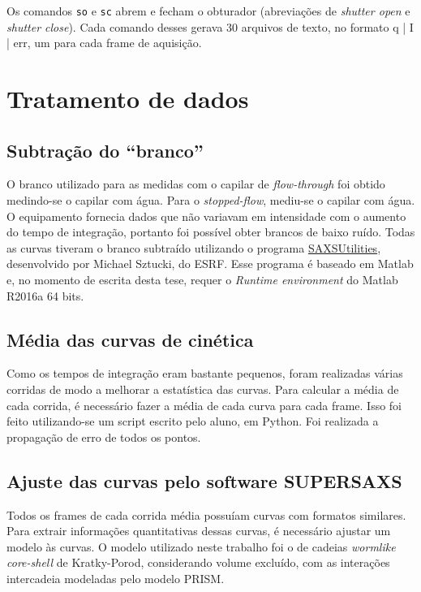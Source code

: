 			Os comandos \texttt{so} e \texttt{sc} abrem e fecham o obturador (abreviações de \emph{shutter open} e \emph{shutter close}). Cada comando desses gerava 30 arquivos de texto, no formato q | I | err, um para cada frame de aquisição. 


		\section{Tratamento de dados}
			\subsection{Subtração do ``branco''}
			
			O branco utilizado para as medidas com o capilar de \emph{flow-through} foi obtido medindo-se o capilar com água. Para o \emph{stopped-flow}, mediu-se o capilar com água. O equipamento fornecia dados que não variavam em intensidade com o aumento do tempo de integração, portanto foi possível obter brancos de baixo ruído. Todas as curvas tiveram o branco subtraído utilizando o programa \href{http://www.sztucki.de/SAXSutilities/}{SAXSUtilities}, desenvolvido por Michael Sztucki, do ESRF. Esse programa é baseado em Matlab e, no momento de escrita desta tese, requer o \emph{Runtime environment} do Matlab R2016a 64 bits.
			
			\subsection{Média das curvas de cinética}
			
			Como os tempos de integração eram bastante pequenos, foram realizadas várias corridas de modo a melhorar a estatística das curvas. Para calcular a média de cada corrida, é necessário fazer a média de cada curva para cada frame. Isso foi feito utilizando-se um script escrito pelo aluno, em Python. Foi realizada a propagação de erro de todos os pontos. %
			
			\subsection{Ajuste das curvas pelo software SUPERSAXS}
			
			Todos os frames de cada corrida média possuíam curvas com formatos similares. Para extrair informações quantitativas dessas curvas, é necessário ajustar um modelo às curvas. O modelo utilizado neste trabalho foi o de cadeias \emph{wormlike} \emph{core-shell} de Kratky-Porod, considerando volume excluído, com as interações intercadeia modeladas pelo modelo PRISM. 
			
